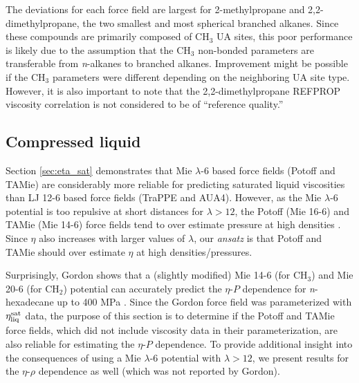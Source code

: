 \documentclass[preprint,review,12pt]{elsarticle}
\begin{document}
	
	The deviations for each force field are largest for 2-methylpropane and 2,2-dimethylpropane, the two smallest and most spherical branched alkanes. Since these compounds are primarily composed of CH$_3$ UA sites, this poor performance is likely due to the assumption that the CH$_3$ non-bonded parameters are transferable from \textit{n}-alkanes to branched alkanes. Improvement might be possible if the CH$_3$ parameters were different depending on the neighboring UA site type. However, it is also important to note that the 2,2-dimethylpropane REFPROP viscosity correlation is not considered to be of ``reference quality.''
	
	\subsection{Compressed liquid} \label{sec:T293highP}
	
	Section \ref{sec:eta_sat} demonstrates that Mie $\lambda$-6 based force fields (Potoff and TAMie) are considerably more reliable for predicting saturated liquid viscosities than LJ 12-6 based force fields (TraPPE and AUA4). However, as the Mie $\lambda$-6 potential is too repulsive at short distances for $\lambda > 12$, the Potoff (Mie 16-6) and TAMie (Mie 14-6) force fields tend to over estimate pressure at high densities \cite{Postdoc_2}. Since $\eta$ also increases with larger values of $\lambda$, our \textit{ansatz} is that Potoff and TAMie should over estimate $\eta$ at high densities/pressures. 
	
	Surprisingly, Gordon shows that a (slightly modified) Mie 14-6 (for CH$_3$) and Mie 20-6 (for CH$_2$) potential can accurately predict the $\eta$-$P$ dependence for \textit{n}-hexadecane up to 400 MPa \cite{Gordon2006}. Since the Gordon force field was parameterized with $\eta_{\rm liq}^{\rm sat}$ data, the purpose of this section is to determine if the Potoff and TAMie force fields, which did not include viscosity data in their parameterization, are also reliable for estimating the $\eta$-$P$ dependence. To provide additional insight into the consequences of using a Mie $\lambda$-6 potential with $\lambda > 12$, we present results for the $\eta$-$\rho$ dependence as well (which was not reported by Gordon). 
	
	
\end{document}
